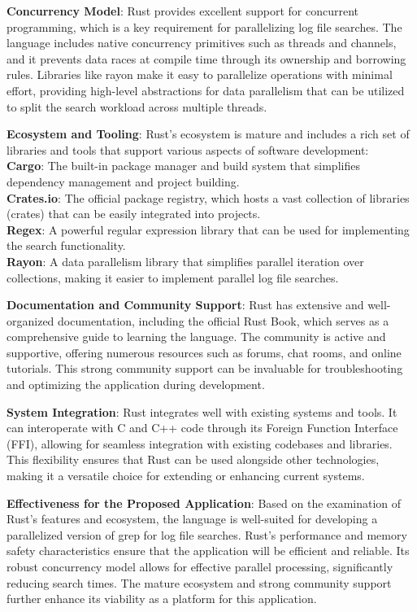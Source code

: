 \documentclass[letterpaper,twocolumn,10pt]{article}
\begin{document}
\noindent \textbf{Concurrency Model}: Rust provides excellent support for concurrent programming, which is a key requirement for parallelizing log file searches. The language includes native concurrency primitives such as threads and channels, and it prevents data races at compile time through its ownership and borrowing rules. Libraries like rayon make it easy to parallelize operations with minimal effort, providing high-level abstractions for data parallelism that can be utilized to split the search workload across multiple threads.

\noindent \textbf{Ecosystem and Tooling}: Rust’s ecosystem is mature and includes a rich set of libraries and tools that support various aspects of software development:\\
     		\phantom{aaaa} \textbf{Cargo}: The built-in package manager and build system that simplifies dependency management and project building.\\
     		\phantom{aaaa} \textbf{Crates.io}: The official package registry, which hosts a vast collection of libraries (crates) that can be easily integrated into projects.\\
		\phantom{aaaa} \textbf{Regex}: A powerful regular expression library that can be used for implementing the search functionality.\\
		\phantom{aaaa} \textbf{Rayon}: A data parallelism library that simplifies parallel iteration over collections, making it easier to implement parallel log file searches.
	
\noindent \textbf{Documentation and Community Support}: Rust has extensive and well-organized documentation, including the official Rust Book, which serves as a comprehensive guide to learning the language. The community is active and supportive, offering numerous resources such as forums, chat rooms, and online tutorials. This strong community support can be invaluable for troubleshooting and optimizing the application during development.

\noindent \textbf{System Integration}: Rust integrates well with existing systems and tools. It can interoperate with C and C++ code through its Foreign Function Interface (FFI), allowing for seamless integration with existing codebases and libraries. This flexibility ensures that Rust can be used alongside other technologies, making it a versatile choice for extending or enhancing current systems.

\noindent \textbf{Effectiveness for the Proposed Application}: Based on the examination of Rust’s features and ecosystem, the language is well-suited for developing a parallelized version of grep for log file searches. Rust’s performance and memory safety characteristics ensure that the application will be efficient and reliable. Its robust concurrency model allows for effective parallel processing, significantly reducing search times. The mature ecosystem and strong community support further enhance its viability as a platform for this application.
\end{document}
